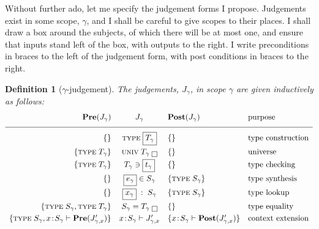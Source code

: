 \documentclass{jfp1}
\newtheorem{definition}[theorem]{Definition}
\begin{document}
Without further ado, let me specify the judgement forms I propose. Judgements
exist in some scope, $\gamma$, and I shall be careful to give scopes to their
places. I shall draw a box around the subjects, of which there will be at
most one, and ensure that inputs stand left of the box, with outputs to the right.
I write preconditions in braces to the left of the judgement form, with post
conditions in braces to the right.

\newcommand{\bx}[1]{\framebox{\ensuremath{#1}}}
\newcommand{\ty}[1]{\textsc{type}\;#1}
\newcommand{\univ}[1]{\textsc{univ}\;#1}
\newcommand{\chk}[2]{#1 \ni #2}
\newcommand{\syn}[2]{#1 \in #2}
\newcommand{\cxe}[2]{#1\!:\!#2\vdash}
\newcommand{\cxl}[2]{#1\;:\;#2}
\newcommand{\Pre}[1]{\textbf{Pre}(#1)}
\newcommand{\Post}[1]{\textbf{Post}(#1)}
\begin{definition}[$\gamma$-judgement]
  The judgements, $J_\gamma$, in scope $\gamma$ are given inductively as follows:
  \[\begin{array}{r@{\quad}c@{\quad}l@{\quad}l}
      \Pre{J_\gamma} & J_\gamma& \Post{J_\gamma} & \mbox{purpose} \\
      \hline
      \{\} &\ty{\bx{T_\gamma}}& \{\}  & \mbox{type construction}
                                        \smallskip\\
      \{\ty{T_\gamma}\} &\univ{T_\gamma}\;\bx{}& \{\}  & \mbox{universe}
                                        \smallskip\\
      \{\ty{T_\gamma}\} & \chk{T_\gamma}{\bx{t_\gamma}} &\{\}  & \mbox{type checking}
                                                                 \smallskip\\
      \{\}  & \syn{\bx{e_\gamma}}{S_\gamma} & \{\ty{S_\gamma}\} & \mbox{type synthesis}
                                                                  \smallskip\\
      \{\}  & \cxl{\bx{x_\gamma}}{S_\gamma} & \{\ty{S_\gamma}\} & \mbox{type lookup}
                                                             \smallskip\\
      \{\ty{S_\gamma},\ty{T_\gamma}\} & S_\gamma = T_\gamma\;\bx{} & \{\}  & \mbox{type equality}
                                                                             \smallskip\\
      \{\ty{S_\gamma},\cxe x{S_\gamma} \Pre{J'_{\gamma,x}}\} & \cxe x{S_\gamma} J'_{\gamma,x}
           & \{\cxe x{S_\gamma}\Post{J'_{\gamma,x}}\} & \mbox{context extension} 
  \end{array}\]
\end{definition}
\end{document}
